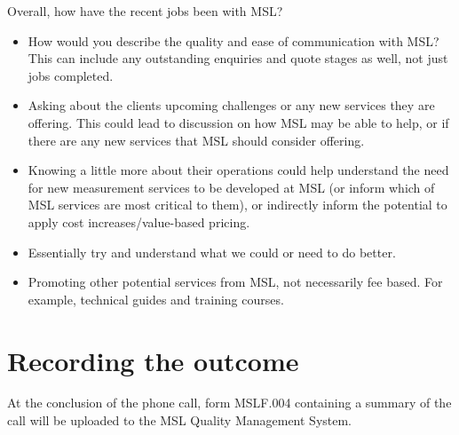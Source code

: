 Overall, how have the recent jobs been with MSL?
\begin{itemize}
\item How would you describe the quality and ease of communication with MSL?  This can include any outstanding enquiries and quote stages as well, not just jobs completed.
\item Asking about the clients upcoming challenges or any new services they are offering. This could lead to discussion on how MSL may be able to help, or if there are any new services that MSL should consider offering.
\item Knowing a little more about their operations could help understand the need for new measurement services to be developed at MSL (or inform which of MSL services are most critical to them), or indirectly inform the potential to apply cost increases/value-based pricing.
\item Essentially try and understand what we could or need to do better.
\item Promoting other potential services from MSL, not necessarily fee based.  For example, technical guides and training courses.
\end{itemize}

\section{Recording the outcome}

At the conclusion of the phone call, form MSLF.004 containing a summary of the call will be uploaded to the MSL Quality Management System.
